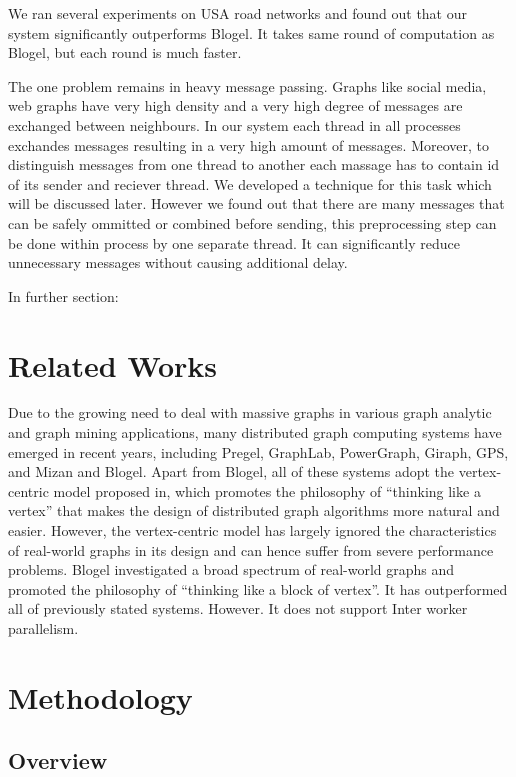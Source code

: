 \documentclass{sig-alternate}
\begin{document}
We ran several experiments on USA road networks and found out that our system significantly outperforms Blogel.  It takes same round of computation as Blogel, but each round is much faster.       

The one problem remains in heavy message passing. Graphs like social media, web graphs have very high density and a very high degree of messages are exchanged between neighbours. In our system each thread in all processes exchandes messages resulting in a very high amount of messages. Moreover, to distinguish messages from one thread to another each massage has to contain id of its sender and reciever thread. We developed a technique for this task which will be discussed later.   However we found out that there are many messages that can be safely ommitted or combined before sending, this preprocessing step can be done within process by one separate thread. It can significantly reduce unnecessary messages without causing additional delay.   

In further section:






\section{Related Works}
 Due to the growing need to deal with massive graphs in various
graph analytic and graph mining applications, many distributed
graph computing systems have emerged in recent years, including
Pregel, GraphLab, PowerGraph, Giraph, GPS,
and Mizan and Blogel. Apart from Blogel, all of these systems adopt the vertex-centric
model proposed in, which promotes the philosophy of “thinking
like a vertex” that makes the design of distributed graph algorithms
more natural and easier. However, the vertex-centric model
has largely ignored the characteristics of real-world graphs in its
design and can hence suffer from severe performance problems.
Blogel investigated a broad spectrum of real-world graphs and
promoted the philosophy of “thinking
like a block of vertex”. It has outperformed all of previously stated systems. However. It does not support Inter worker parallelism.   
 
\section{Methodology}

\subsection{Overview}
\end{document}
